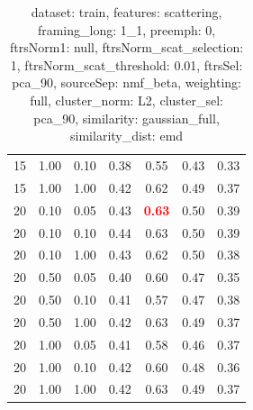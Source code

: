 \begin{table}
\begin{center}
\begin{tabular}{lllcccc}
15 & 1.00 & 0.10 & 0.38 & 0.55 & 0.43 & 0.33 \\ 
15 & 1.00 & 1.00 & 0.42 & 0.62 & 0.49 & 0.37 \\ 
20 & 0.10 & 0.05 & 0.43 & \textbf{\textcolor{red}{0.63}} & 0.50 & 0.39 \\ 
20 & 0.10 & 0.10 & 0.44 & 0.63 & 0.50 & 0.39 \\ 
20 & 0.10 & 1.00 & 0.43 & 0.62 & 0.50 & 0.38 \\ 
20 & 0.50 & 0.05 & 0.40 & 0.60 & 0.47 & 0.35 \\ 
20 & 0.50 & 0.10 & 0.41 & 0.57 & 0.47 & 0.38 \\ 
20 & 0.50 & 1.00 & 0.42 & 0.63 & 0.49 & 0.37 \\ 
20 & 1.00 & 0.05 & 0.41 & 0.58 & 0.46 & 0.37 \\ 
20 & 1.00 & 0.10 & 0.42 & 0.60 & 0.48 & 0.36 \\ 
20 & 1.00 & 1.00 & 0.42 & 0.63 & 0.49 & 0.37 \\ 
\end{tabular} 
\end{center} 
\caption{dataset: train, features: scattering, framing\_long: 1\_1, preemph: 0, ftrsNorm1: null, ftrsNorm\_scat\_selection: 1, ftrsNorm\_scat\_threshold: 0.01, ftrsSel: pca\_90, sourceSep: nmf\_beta, weighting: full, cluster\_norm: L2, cluster\_sel: pca\_90, similarity: gaussian\_full, similarity\_dist: emd} 
\label{datasetrFeaturscFraminlong1_1Preemp0Ftrsnorm1nuFtrsnoscatselect1Ftrsnoscatthresh0.01Ftrsselpc90SourcesepnmbeWeightfuClustenormL2Clusteselpc90SimilagafuSimiladistem} 
\end{table} 
 
